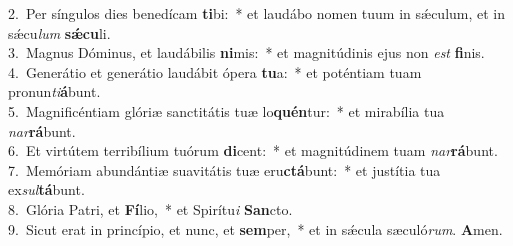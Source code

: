 {2.~}Per síngulos dies benedícam \textbf{ti}bi:~* et laudábo nomen tuum in sǽculum, et in sǽcu\textit{lum} \textbf{sǽ}\textbf{cu}li.\\
{3.~}Magnus Dóminus, et laudábilis \textbf{ni}mis:~* et magnitúdinis ejus non \textit{est} \textbf{fi}nis.\\
{4.~}Generátio et generátio laudábit ópera \textbf{tu}a:~* et poténtiam tuam pronun\textit{ti}\textbf{á}bunt.\\
{5.~}Magnificéntiam glóriæ sanctitátis tuæ lo\textbf{quén}tur:~* et mirabília tua \textit{nar}\textbf{rá}bunt.\\
{6.~}Et virtútem terribílium tuórum \textbf{di}cent:~* et magnitúdinem tuam \textit{nar}\textbf{rá}bunt.\\
{7.~}Memóriam abundántiæ suavitátis tuæ eru\textbf{ctá}bunt:~* et justítia tua ex\textit{sul}\textbf{tá}bunt.\\
{8.~}Glória Patri, et \textbf{Fí}lio,~* et Spirítu\textit{i} \textbf{San}cto.\\
{9.~}Sicut erat in princípio, et nunc, et \textbf{sem}per,~* et in sǽcula sæculó\textit{rum}. \textbf{A}men.\\

